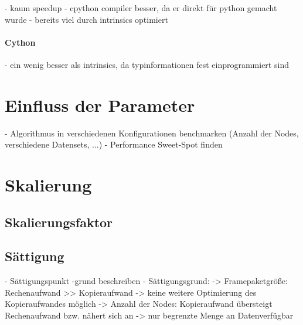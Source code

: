 \begin{correctmore}
	- kaum speedup
	- cpython compiler besser, da er direkt für python gemacht wurde
	- bereits viel durch intrinsics optimiert
\end{correctmore}

\paragraph{Cython}

\begin{correctmore}
	- ein wenig besser als intrinsics, da typinformationen fest einprogrammiert sind
\end{correctmore}

\section{Einfluss der Parameter}

\begin{correctmore}
	- Algorithmus in verschiedenen Konfigurationen benchmarken (Anzahl der Nodes, verschiedene Datensets, ...)
	- Performance Sweet-Spot finden
\end{correctmore}

\section{Skalierung}

\subsection{Skalierungsfaktor}


\subsection{Sättigung}

\begin{correctmore}
	- Sättigungspunkt -grund beschreiben
	- Sättigungsgrund:
	-> Framepaketgröße: Rechenaufwand >> Kopieraufwand -> keine weitere Optimierung des Kopieraufwandes möglich
	-> Anzahl der Nodes: Kopieraufwand übersteigt Rechenaufwand bzw. nähert sich an
	-> nur begrenzte Menge an Datenverfügbar
\end{correctmore}